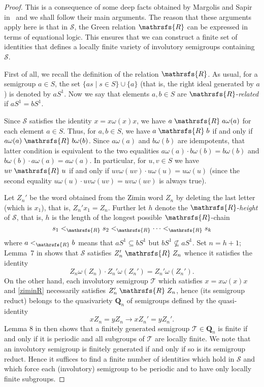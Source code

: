 \documentclass[11pt,reqno]{amsart}
\numberwithin{equation}{section}
\theoremstyle{remark}
\def\om{\omega}
\def\Rc{\mathrsfs{R}}
\begin{document}
\begin{proof}
This is a consequence of some deep facts obtained by Margolis and
Sapir in~\cite{margolissapir} and we shall follow their main
arguments. The reason that these arguments apply here is that in
$\mathcal{S}$, the Green relation $\Rc$ can be expressed in terms
of equational logic. This ensures that we can construct a finite
set of identities that defines a locally finite variety of
involutory semigroups containing $\mathcal{S}$.

First of all, we recall the definition of the relation $\Rc$. As
usual, for a semigroup $a\in S$, the set $\{as\mid s\in
S\}\cup\{a\}$ (that is, the right ideal generated by $a$) is
denoted by $aS^1$. Now we say that elements $a,b\in S$ are
$\Rc$-\emph{related} if $aS^1=bS^1$.

Since $\mathcal{S}$ satisfies the identity $x=x\om(x)x$, we have
$a\mathrel{\Rc}a\om(a)$ for each element $a\in S$. Thus, for
$a,b\in S$, we have $a\mathrel{\Rc}b$ if and only if
$a\om(a)\mathrel{\Rc}b\om(b)$. Since $a\om(a)$ and $b\om(b)$ are
idempotents, that latter condition is equivalent to the two
equalities $a\om(a)\cdot b\om(b)=b\om(b)$ and $b\om(b)\cdot
a\om(a)=a\om(a)$. In particular, for $u,v\in S$ we have
$uv\mathrel{\Rc}u$ if and only if $uv\om(uv)\cdot u\om(u)=u\om(u)$
(since the second equality $u\om(u)\cdot uv\om(uv)=uv\om(uv)$ is
always true).

Let $Z_n'$ be the word obtained from the Zimin word $Z_n$ by
deleting the last letter (which is $x_1$), that is, $Z_n'x_1=Z_n$.
Further let $h$ denote the $\Rc$-\emph{height} of $\mathcal{S}$,
that is, $h$ is the length of the longest possible $\Rc$-chain
$$s_1\mathrel{{<}_{\Rc}}s_2\mathrel{{<}_{\Rc}}\cdots\mathrel{{<}_{\Rc}}s_k$$
where $a\mathrel{{<}_{\Rc}}b$ means that $aS^1\subseteq bS^1$ but
$bS^1\nsubseteq aS^1$. Set $n=h+1$; Lemma~7 in
\cite{margolissapir} shows that $\mathcal{S}$ satisfies
$Z_n'\mathrel{\Rc}Z_n$ whence it satisfies the identity
\begin{equation}
\label{ziminR} Z_n\om(Z_n)\cdot Z_n'\om(Z_n')=Z_n'\om(Z_n').
\end{equation}
On the other hand, each involutory semigroup $\mathcal{T}$ which
satisfies $x=x\om(x)x$ and \eqref{ziminR} necessarily satisfies
$Z_n'\mathrel{\Rc}Z_n$, hence (its semigroup reduct) belongs to
the quasivariety $\mathbf{Q}_n$ of semigroups defined by the
quasi-identity
\begin{equation*}
xZ_n=yZ_n\rightarrow xZ_n'=yZ_n'.
\end{equation*}
Lemma 8 in \cite{margolissapir} then shows that a finitely
generated semigroup $\mathcal{T}\in\mathbf{Q}_n$ is finite if and
only if it is periodic and all subgroups of $\mathcal{T}$ are
locally finite. We note that an involutory semigroup is finitely
generated if and only if so is its semigroup reduct. Hence it
suffices to find a finite number of identities which hold in
$\mathcal{S}$ and which force each (involutory) semigroup to be
periodic and to have only locally finite subgroups.


\end{proof}
\end{document}
